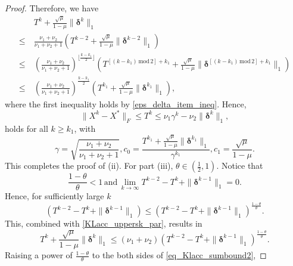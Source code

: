 \documentclass[twoside,11pt]{article}
\numberwithin{equation}{section}
\begin{document}
\begin{proof}
 Therefore,  we have 
 \begin{equation}
   \begin{aligned}
        &\ T^{k}+\frac{\sqrt{\mu}}{1-\mu}\|\bm{\delta}^{k}\|_{1} \\
    \le &\ \frac{\nu_{1}+\nu_{2}}{\nu_{1}+\nu_{2}+1}  (T^{k-2}+\frac{\sqrt{\mu}}{1-\mu}\|\bm{\delta}^{k-2}\|_{1})\\
    \le &\  \left(\frac{\nu_{1}+\nu_{2}}{\nu_{1}+\nu_{2}+1}\right)^{\lfloor\frac{k-k_{1}}{2}\rfloor}
            \left(T^{[ (k-k_{1})\,\mathrm{mod}\, 2]+k_{1}}+\frac{\sqrt{\mu}}{1-\mu}\|\bm{\delta}^{[ (k-k_{1})\,\mathrm{mod}\, 2]+k_{1}}\|_{1}\right) \\
    \le &\ \left(\frac{\nu_{1}+\nu_{2}}{\nu_{1}+\nu_{2}+1}\right)^{\frac{k-k_{1}}{2}} \left(T^{k_{1}}+\frac{\sqrt{\mu}}{1-\mu}\|\bm{\delta}^{k_{1}}\|_{1} \right),
   \end{aligned}\end{equation} 
  where the first inequality holds by \eqref{eps_delta_item_ineq}. 
  Hence, 
  \begin{equation}
     \|X^{k}-X^{*}\|_{F} \le T^{k} \le \nu_{1}\gamma^{k}-\nu_{2}\|\bm{\delta}^{k}\|_{1},
  \end{equation} 
  holds for all $k\ge k_{1} $, with 
  \begin{equation*}
    \gamma=\sqrt{\frac{\nu_{1}+\nu_{2}}{\nu_{1}+\nu_{2}+1}},c_{0} = \frac{T^{k_{1}}+\frac{\sqrt{\mu}}{1-\mu}\|\bm{\delta}^{k_{1}}\|_{1}}{\gamma^{k_{1}}},c_{1} = \frac{\sqrt{\mu}}{1-\mu}.
  \end{equation*}
  This completes the proof of (ii).
  For part  (iii), $\theta\in (\frac{1}{2},1) $. Notice that 
  \begin{equation*}
  \frac{1-\theta}{\theta}<1 \,\text{and}\, \lim\limits_{k\to\infty}T^{k-2}-T^{k}+\|\bm{\delta}^{k-1}\|_{1} =0. 
  \end{equation*}
  Hence, for sufficiently large $k$  
  \begin{equation}
    \left( T^{k-2}-T^{k}+\|\bm{\delta}^{k-1}\|_{1}\right) \le  \left(T^{k-2}-T^{k}+\|\bm{\delta}^{k-1}\|_{1}\right)^{\frac{1-\theta}{\theta}} .
 \end{equation}
 This, combined with \eqref{KLacc_uppersk_par}, results in 
 \begin{equation}\label{eq_Klacc_sumbound2}
   T^{k}+\frac{\sqrt{\mu}}{1-\mu}\|\bm{\delta}^{k}\|_{1} \le  (\nu_{1}+\nu_{2}) \left(T^{k-2}-T^{k}+\|\bm{\delta}^{k-1}\|_{1}\right)^{\frac{1-\theta}{\theta}}.
 \end{equation}
 Raising a power of $\frac{1-\theta}{\theta} $ to the both sides of \eqref{eq_Klacc_sumbound2},    

\end{proof}
\end{document}
